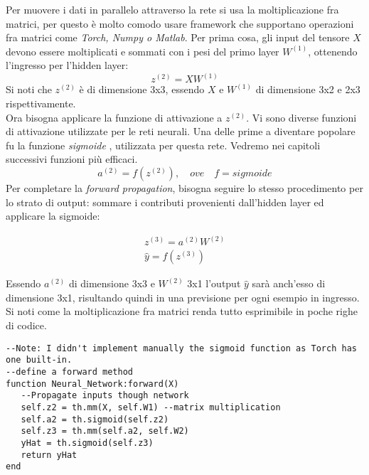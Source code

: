 Per muovere i dati in parallelo attraverso la rete si usa la moltiplicazione fra matrici, per questo è molto comodo usare framework che supportano operazioni fra matrici come \emph{Torch, Numpy o Matlab}. Per prima cosa, gli input del tensore $X$ devono essere moltiplicati e sommati con i pesi del primo layer $W^{(1)}$, ottenendo l'ingresso per l'hidden layer:
\begin{equation}
z^{(2)} = XW^{(1)} \tag{1}
\end{equation}
Si noti che $z^{(2)}$ è di dimensione 3x3, essendo $X$ e $W^{(1)}$ di dimensione 3x2 e 2x3 rispettivamente. \\
Ora bisogna applicare la funzione di attivazione a $z^{(2)}$. Vi sono diverse funzioni di attivazione utilizzate per le reti neurali. Una delle prime a diventare popolare fu la funzione \emph{sigmoide} \parencite{WSigmoid}, utilizzata per questa rete. Vedremo nei capitoli successivi funzioni più efficaci.
\begin{equation}
a^{(2)} = f(z^{(2)}) \tag{2},\quad ove \quad f=sigmoide
\end{equation}
Per completare la \emph{forward propagation}, bisogna seguire lo stesso procedimento per lo strato di output: sommare i contributi provenienti dall'hidden layer ed applicare la sigmoide:
\begin{center}
\begin{align*}
z^{(3)} = a^{(2)}W^{(2)} \tag{3}\\
\hat{y} = f(z^{(3)}) \tag{4}
\end{align*}
\end{center}
Essendo $a^{(2)}$ di dimensione 3x3 e $W^{(2)}$ 3x1 l'output $\hat{y}$ sarà anch'esso di dimensione 3x1, risultando quindi in una previsione per ogni esempio in ingresso. \\
Si noti come la moltiplicazione fra matrici renda tutto esprimibile in poche righe di codice.
\begin{lstlisting}[language={[5.2]Lua}]
--Note: I didn't implement manually the sigmoid function as Torch has one built-in.
--define a forward method
function Neural_Network:forward(X)
   --Propagate inputs though network
   self.z2 = th.mm(X, self.W1) --matrix multiplication
   self.a2 = th.sigmoid(self.z2)
   self.z3 = th.mm(self.a2, self.W2)
   yHat = th.sigmoid(self.z3)
   return yHat
end
\end{lstlisting}
